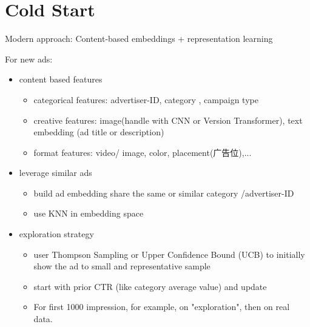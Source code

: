 \section{Cold Start}
Modern approach: Content-based embeddings + representation learning

For new ads:
\begin{itemize}
    \item content based features
    \begin{itemize}
        \item categorical features: advertiser-ID, category , campaign type
        \item creative features: image(handle with CNN or Version Transformer), text embedding (ad title or description)
        \item format features: video/ image, color, placement(广告位),...
    \end{itemize}

    
    \item leverage similar ads
    \begin{itemize}
        \item build ad embedding share the same or similar category /advertiser-ID
        \item use KNN in embedding space
    \end{itemize}

    \item exploration strategy
    \begin{itemize}
        \item user Thompson Sampling or Upper Confidence Bound (UCB) to initially show the ad to small and representative sample
        \item start with prior  CTR (like category average value) and update 
        \item For first 1000 impression, for example, on "exploration", then on real data.
    \end{itemize}
\end{itemize}

